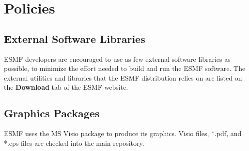
\section{Policies}

\subsection{External Software Libraries}
\label{sec:lib}

ESMF developers are encouraged to use as few external
software libraries as possible, to minimize the effort
needed to build and run the ESMF software.  The external
utilities and libraries that the ESMF distribution relies
on are listed on the {\bf Download} tab of the ESMF website.  

\subsection{Graphics Packages}

ESMF uses the MS Visio package to produce its graphics.
Visio files, *.pdf, and *.eps files are checked into the
main repository.



